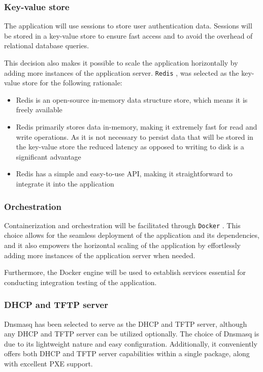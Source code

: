 \documentclass[../main.tex]{subfiles}
\begin{document}
\subsubsection{Key-value store}

The application will use sessions to store user authentication data. Sessions will be stored in a key-value store to ensure fast access and to avoid the overhead of relational database queries.

This decision also makes it possible to scale the application horizontally by adding more instances of the application server.
\texttt{Redis} \cite{redis}, was selected as the key-value store for the following rationale:

\begin{itemize}
  \item Redis is an open-source in-memory data structure store, which means it is freely available
  \item Redis primarily stores data in-memory, making it extremely fast for read and write operations. As it is not necessary to persist data that will be stored in the key-value store the reduced latency as opposed to writing to disk is a significant advantage
  \item Redis has a simple and easy-to-use API, making it straightforward to integrate it into the application
\end{itemize}

\subsubsection{Orchestration}

Containerization and orchestration will be facilitated through \texttt{Docker} \cite{docker}.
This choice allows for the seamless deployment of the application and its dependencies, and it also empowers the horizontal scaling of the application by effortlessly adding more instances of the application server when needed.

Furthermore, the Docker engine will be used to establish services essential for conducting integration testing of the application.

\subsubsection{DHCP and TFTP server}

Dnsmasq \cite{dnsmasq} has been selected to serve as the DHCP and TFTP server, although any DHCP and TFTP server can be utilized optionally. The choice of Dnsmasq is due to its lightweight nature and easy configuration.
Additionally, it conveniently offers both DHCP and TFTP server capabilities within a single package, along with excellent PXE support.
\end{document}
